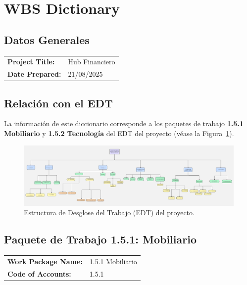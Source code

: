 \section{WBS Dictionary}

\subsection{Datos Generales}

\begin{tabularx}{\textwidth}{@{}lX@{}}
\textbf{Project Title:} & Hub Financiero \\
\textbf{Date Prepared:} & 21/08/2025 \\
\end{tabularx}

\subsection{Relación con el EDT}

La información de este diccionario corresponde a los paquetes de trabajo \textbf{1.5.1 Mobiliario} y \textbf{1.5.2 Tecnología} del EDT del proyecto (véase la Figura~\ref{fig:edt}).

\begin{figure}[H]
  \centering
  \includegraphics[width=\textwidth]{Figures/0. General/EDT.jpg}
  \caption{Estructura de Desglose del Trabajo (EDT) del proyecto.}
  \label{fig:edt}
\end{figure}

\subsection{Paquete de Trabajo 1.5.1: Mobiliario}
\label{sec:wbs151}

\begin{tabularx}{\textwidth}{@{}lX@{}}
\textbf{Work Package Name:} & 1.5.1 Mobiliario \\
\textbf{Code of Accounts:} & 1.5.1 \\
\end{tabularx}

